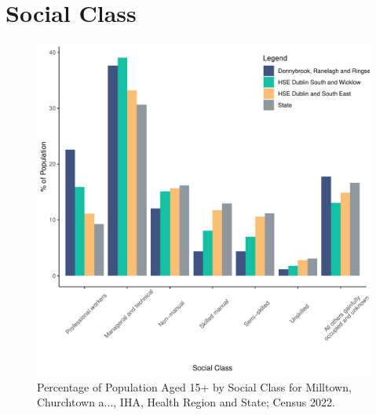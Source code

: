 \documentclass{article}
\begin{document}
\section{Social Class}\label{sect:SC}
\begin{figure}[H]
	\centering
	\includegraphics[width = 140mm]{../figures/SocialClassED.pdf}
	\caption{Percentage of Population Aged 15+ by Social Class for Milltown, Churchtown a..., IHA, Health Region and State; Census 2022.}
	\label{fig:vbnv}
	\end{figure}
\end{document}
